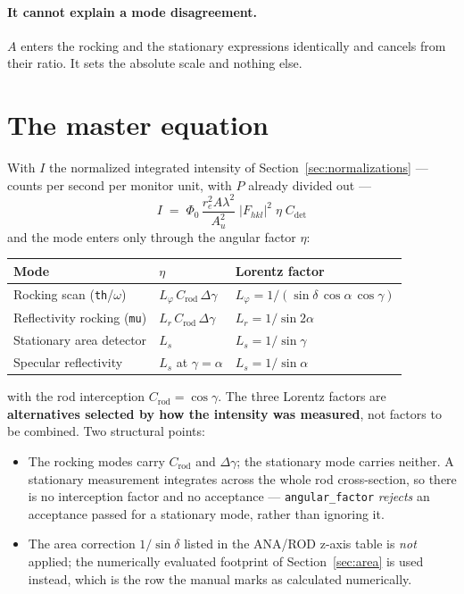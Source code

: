 \documentclass[11pt,a4paper]{article}
\newcommand{\Fhkl}{\left|F_{hkl}\right|^{2}}
\newcommand{\dgam}{\Delta\gamma}
\newcommand{\Crod}{C_{\mathrm{rod}}}
\newcommand{\Cdet}{C_{\mathrm{det}}}
\newcommand{\re}{r_{e}}
\newcommand{\Au}{A_{u}}
\newcommand{\code}[1]{\texttt{\small #1}}
\begin{document}
\paragraph{It cannot explain a mode disagreement.} $A$ enters the rocking and
the stationary expressions identically and cancels from their ratio. It sets
the absolute scale and nothing else.

\section{The master equation}
\label{sec:master}

With $I$ the normalized integrated intensity of
Section~\ref{sec:normalizations} --- counts per second per monitor unit, with
$P$ already divided out ---
\begin{equation}
  \boxed{\;
  I \;=\; \Phi_0\, \frac{\re^{2} A \lambda^{2}}{\Au^{2}}\;
          \Fhkl \; \eta \; \Cdet \; }
  \label{eq:master}
\end{equation}
and the mode enters only through the angular factor $\eta$:

\begin{center}
\begin{tabular}{@{}lll@{}}
\toprule
Mode & $\eta$ & Lorentz factor \\
\midrule
Rocking scan (\code{th}/$\omega$)      & $L_\varphi\,\Crod\,\dgam$
  & $L_\varphi = 1/(\sin\delta\,\cos\alpha\,\cos\gamma)$ \\
Reflectivity rocking (\code{mu})       & $L_r\,\Crod\,\dgam$
  & $L_r = 1/\sin 2\alpha$ \\
Stationary area detector               & $L_s$
  & $L_s = 1/\sin\gamma$ \\
Specular reflectivity                  & $L_s$ at $\gamma = \alpha$
  & $L_s = 1/\sin\alpha$ \\
\bottomrule
\end{tabular}
\end{center}

\noindent
with the rod interception $\Crod = \cos\gamma$. The three Lorentz factors are
\textbf{alternatives selected by how the intensity was measured}, not factors
to be combined. Two structural points:

\begin{itemize}[leftmargin=1.4em]
\item The rocking modes carry $\Crod$ and $\dgam$; the stationary mode carries
  neither. A stationary measurement integrates across the whole rod
  cross-section, so there is no interception factor and no acceptance ---
  \code{angular\_factor} \emph{rejects} an acceptance passed for a stationary
  mode, rather than ignoring it.
\item The area correction $1/\sin\delta$ listed in the ANA/ROD z-axis table is
  \emph{not} applied; the numerically evaluated footprint of
  Section~\ref{sec:area} is used instead, which is the row the manual marks as
  calculated numerically.
\end{itemize}
\end{document}
